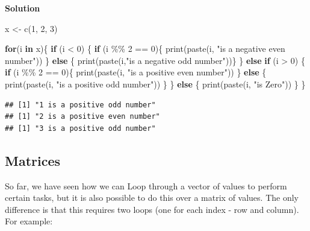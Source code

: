 \documentclass[
]{book}
\newenvironment{Shaded}{\begin{snugshade}}{\end{snugshade}}
\newcommand{\ControlFlowTok}[1]{\textcolor[rgb]{0.13,0.29,0.53}{\textbf{#1}}}
\newcommand{\DecValTok}[1]{\textcolor[rgb]{0.00,0.00,0.81}{#1}}
\newcommand{\FunctionTok}[1]{\textcolor[rgb]{0.00,0.00,0.00}{#1}}
\newcommand{\NormalTok}[1]{#1}
\newcommand{\OtherTok}[1]{\textcolor[rgb]{0.56,0.35,0.01}{#1}}
\newcommand{\SpecialCharTok}[1]{\textcolor[rgb]{0.00,0.00,0.00}{#1}}
\newcommand{\StringTok}[1]{\textcolor[rgb]{0.31,0.60,0.02}{#1}}
\theoremstyle{definition}
\theoremstyle{definition}
\theoremstyle{definition}
\theoremstyle{definition}
\theoremstyle{remark}
\begin{document}
\textbf{Solution}

\begin{Shaded}
\begin{Highlighting}[]
\NormalTok{x }\OtherTok{\textless{}{-}} \FunctionTok{c}\NormalTok{(}\DecValTok{1}\NormalTok{, }\DecValTok{2}\NormalTok{, }\DecValTok{3}\NormalTok{)}

\ControlFlowTok{for}\NormalTok{(i }\ControlFlowTok{in}\NormalTok{ x)\{}
\ControlFlowTok{if}\NormalTok{ (i }\SpecialCharTok{\textless{}} \DecValTok{0}\NormalTok{) \{}
  \ControlFlowTok{if}\NormalTok{ (i }\SpecialCharTok{\%\%} \DecValTok{2} \SpecialCharTok{==} \DecValTok{0}\NormalTok{)\{}
    \FunctionTok{print}\NormalTok{(}\FunctionTok{paste}\NormalTok{(i, }\StringTok{"is a negative even number"}\NormalTok{))}
\NormalTok{  \} }\ControlFlowTok{else}\NormalTok{ \{ }
    \FunctionTok{print}\NormalTok{(}\FunctionTok{paste}\NormalTok{(i,}\StringTok{"is a negative odd number"}\NormalTok{))\}}
\NormalTok{\} }\ControlFlowTok{else} \ControlFlowTok{if}\NormalTok{ (i }\SpecialCharTok{\textgreater{}} \DecValTok{0}\NormalTok{) \{}
  \ControlFlowTok{if}\NormalTok{ (i }\SpecialCharTok{\%\%} \DecValTok{2} \SpecialCharTok{==} \DecValTok{0}\NormalTok{)\{}
    \FunctionTok{print}\NormalTok{(}\FunctionTok{paste}\NormalTok{(i, }\StringTok{"is a positive even number"}\NormalTok{))}
\NormalTok{  \} }\ControlFlowTok{else}\NormalTok{ \{}
    \FunctionTok{print}\NormalTok{(}\FunctionTok{paste}\NormalTok{(i, }\StringTok{"is a positive odd number"}\NormalTok{))}
\NormalTok{  \}}
\NormalTok{\} }\ControlFlowTok{else}\NormalTok{ \{}
  \FunctionTok{print}\NormalTok{(}\FunctionTok{paste}\NormalTok{(i, }\StringTok{"is Zero"}\NormalTok{))}
\NormalTok{  \}}
\NormalTok{\}}
\end{Highlighting}
\end{Shaded}

\begin{verbatim}
## [1] "1 is a positive odd number"
## [1] "2 is a positive even number"
## [1] "3 is a positive odd number"
\end{verbatim}

\hypertarget{matrices-1}{%
\subsection{Matrices}\label{matrices-1}}

So far, we have seen how we can Loop through a vector of values to perform certain tasks, but it is also possible to do this over a matrix of values. The only difference is that this requires two loops (one for each index - row and column). For example:
\end{document}
